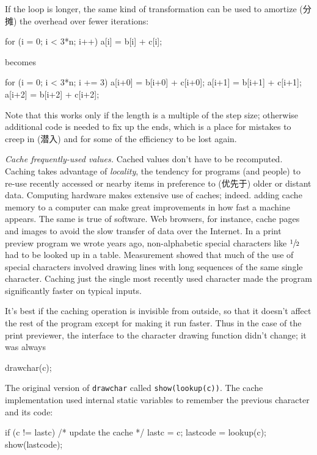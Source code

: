 If the loop is longer, the same kind of transformation can be used to
amortize (分摊) the overhead over fewer iterations:
\begin{wellcode}
    for (i = 0; i < 3*n; i++)
        a[i] = b[i] + c[i];
\end{wellcode}
becomes
\begin{wellcode}
    for (i = 0; i < 3*n; i += 3) {
        a[i+0] = b[i+0] + c[i+0];
        a[i+1] = b[i+1] + c[i+1];
        a[i+2] = b[i+2] + c[i+2];
    }
\end{wellcode}
Note that this works only if the length is a multiple of the step size;
otherwise additional code is needed to fix up the ends, which is a place
for mistakes to creep in (潜入) and for some of the efficiency to be lost
again.

\emph{Cache frequently-used values.} Cached values don't have to be
recomputed.  Caching takes advantage of \textit{locality}, the tendency for
programs (and people) to re-use recently accessed or nearby items in
preference to (优先于) older or distant data. Computing hardware makes
extensive use of caches; indeed. adding cache memory to a computer can make
great improvements in how fast a machine appears. The same is true of
software.  Web browsers, for instance, cache pages and images to avoid the
slow transfer of data over the Internet. In a print preview program we
wrote years ago, non-alphabetic special characters like $\sfrac{1}{2}$ had
to be looked up in a table. Measurement showed that much of the use of
special characters involved drawing lines with long sequences of the same
single character. Caching just the single most recently used character made
the program significantly faster on typical inputs.

It's best if the caching operation is invisible from outside, so that it
doesn't affect the rest of the program except for making it run faster.
Thus in the case of the print previewer, the interface to the character
drawing function didn't change; it was always
\begin{wellcode}
    drawchar(c);
\end{wellcode}
The original version of \verb'drawchar' called \verb'show(lookup(c))'. The
cache implementation used internal static variables to remember the
previous character and its code:
\begin{wellcode}
    if (c != lastc) { /* update the cache */
        lastc = c;
        lastcode = lookup(c);
    }
    show(lastcode);
\end{wellcode}

